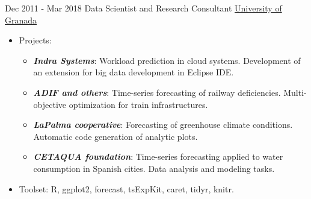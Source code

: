 \documentclass[letterpaper]{twentysecondcv} %
\begin{document}
\begin{twenty}
        
        
        

	  \twentyitem
    	{Dec 2011 -}
		{Mar 2018}
        {Data Scientist and Research Consultant}
        {\href{https://www.indracompany.com/en/}{University of Granada}}
        {
        \begin{itemize}
        	\item Projects:
        	\begin{itemize}
        		\item \textbf{\textit{Indra Systems}}: Workload prediction in cloud systems. Development 	of an extension for big data development in Eclipse IDE.
        		\item \textbf{\textit{ADIF and others}}: Time-series forecasting of railway deficiencies. Multi-objective optimization for train infrastructures.
        		\item \textbf{\textit{LaPalma cooperative}}: Forecasting of greenhouse climate conditions. Automatic code generation of analytic plots.
        		\item \textbf{\textit{CETAQUA foundation}}: Time-series forecasting applied to water consumption in Spanish cities. Data analysis and modeling tasks.
        	\end{itemize}
        	\item Toolset: R, ggplot2, forecast, tsExpKit, caret, tidyr, knitr.
        

\end{itemize}}
\end{twenty}
\end{document}

